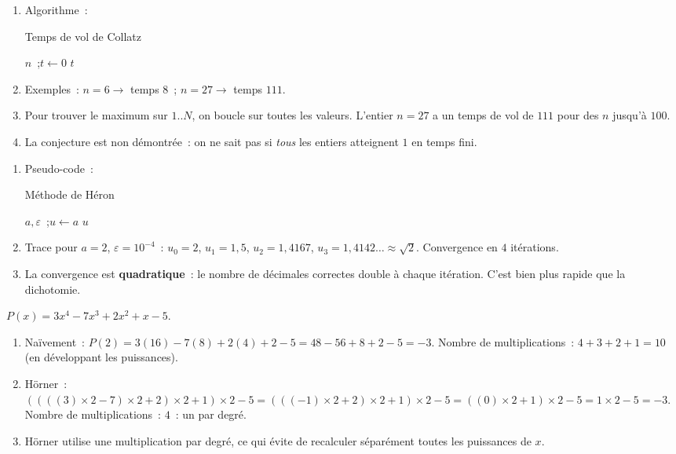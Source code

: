 
\begin{enumerate}
  \item Algorithme~:
\begin{algorithm}[H]
\caption{Temps de vol de Collatz}
\Lire $n$~;\quad $t \leftarrow 0$\;
\Afficher $t$\;
\end{algorithm}
  \item Exemples~: $n=6\to$ temps $8$~; $n=27\to$ temps $111$.
  \item Pour trouver le maximum sur $1..N$, on boucle sur toutes les valeurs.
        L'entier $n=27$ a un temps de vol de $111$ pour des $n$ jusqu'\`a $100$.
  \item La conjecture est non d\'emontr\'ee~: on ne sait pas si \emph{tous} les entiers
        atteignent $1$ en temps fini.
\end{enumerate}


\begin{enumerate}
  \item Pseudo-code~:
\begin{algorithm}[H]
\caption{M\'ethode de H\'eron}
\Lire $a, \varepsilon$~;\quad $u \leftarrow a$\;
\Afficher $u$\;
\end{algorithm}
  \item Trace pour $a=2$, $\varepsilon=10^{-4}$~: $u_0=2$, $u_1=1{,}5$, $u_2=1{,}4167$,
        $u_3=1{,}4142\ldots\approx\sqrt{2}$. Convergence en $4$ it\'erations.
  \item La convergence est \textbf{quadratique}~: le nombre de d\'ecimales correctes
        double \`a chaque it\'eration. C'est bien plus rapide que la dichotomie.
\end{enumerate}


$P(x)=3x^4-7x^3+2x^2+x-5$.

\begin{enumerate}
  \item Na\"ivement~: $P(2)=3(16)-7(8)+2(4)+2-5=48-56+8+2-5=-3$.
        Nombre de multiplications~: $4+3+2+1=10$ (en d\'eveloppant les puissances).
  \item H\"orner~: $((((3)\times2-7)\times2+2)\times2+1)\times2-5
        =(((-1)\times2+2)\times2+1)\times2-5
        =((0)\times2+1)\times2-5=1\times2-5=-3$.\checkmark
        Nombre de multiplications~: $4$~: un par degr\'e.
  \item H\"orner utilise une multiplication par degré, ce qui évite de recalculer
        séparément toutes les puissances de $x$.
\end{enumerate}

